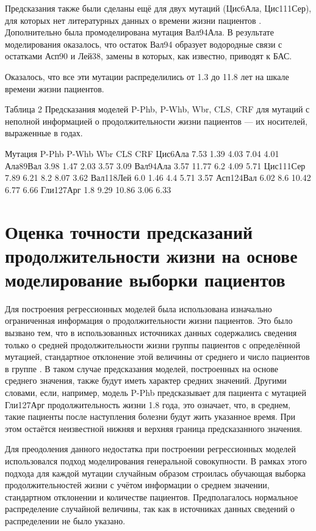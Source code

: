 Предсказания также были сделаны ещё для двух мутаций (Цис6Ала, Цис111Сер), для которых нет литературных данных о времени жизни пациентов \cite{Lepock1990}.
Дополнительно была промоделирована мутация Вал94Ала. В результате моделирования оказалось, что остаток Вал94 образует водородные связи с остатками Асп90 и Лей38, замены в которых, как известно, приводят к БАС.

Оказалось, что все эти мутации распределились от 1.3 до 11.8 лет на шкале времени жизни пациентов.

Таблица 2
Предсказания моделей  P-Phb, P-Whb, Wbr, CLS, CRF для мутаций с неполной информацией о продолжительности жизни пациентов — их носителей, выраженные в годах.

Мутация
P-Phb
P-Whb
Wbr
CLS
CRF
Цис6Ала
7.53
1.39
4.03
7.04
4.01
Ала89Вал
3.98
1.47
2.03
3.57
3.09
Вал94Ала
3.57
11.77
6.2
4.09
5.71
Цис111Сер
7.89
6.21
8.2
8.07
3.62
Вал118Лей
6.0
1.46
4.4
5.71
3.57
Асп124Вал
6.02
8.6
10.42
6.77
6.66
Гли127Арг
1.8
9.29
10.86
3.06
6.33

\section{Оценка точности предсказаний продолжительности жизни на основе моделирование выборки пациентов} \label{sect_MD_crossvalidation}

Для построения регрессионных моделей была использована изначально ограниченная информация о продолжительности жизни пациентов. Это было вызвано тем, что в использованных источниках данных содержались сведения только о средней продолжительности жизни группы пациентов с определённой мутацией, стандартное отклонение этой величины от среднего и число пациентов в группе \cite{Wang2008}. В таком случае предсказания моделей, построенных на основе среднего значения, также будут иметь характер средних значений. Другими словами, если, например, модель P-Phb предсказывает для пациента с мутацией Гли127Арг продолжительность жизни 1.8 года, это означает, что, в среднем, такие пациенты после наступления болезни будут жить указанное время. При этом остаётся неизвестной нижняя и верхняя граница предсказанного значения.

Для преодоления данного недостатка при построении регрессионных моделей использовался подход моделирования генеральной совокупности. В рамках этого подхода для каждой мутации случайным образом строилась обучающая выборка продолжительностей жизни с учётом информации о среднем значении, стандартном отклонении и количестве пациентов. Предполагалось нормальное распределение случайной величины, так как в источниках данных сведений о распределении не было указано. 

